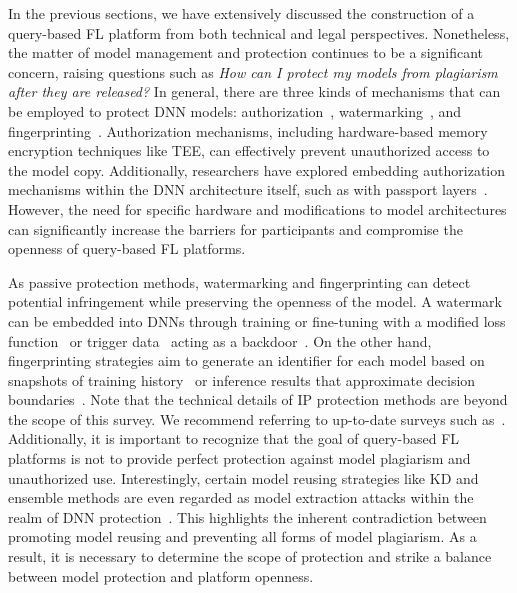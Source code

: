 In the previous sections, we have extensively discussed the construction of a query-based FL platform from both technical and legal perspectives. 
Nonetheless, the matter of model management and protection continues to be a significant concern, raising questions such as \textit{How can I protect my models from plagiarism after they are released?}
In general, there are three kinds of mechanisms that can be employed to protect DNN models: authorization~\cite{hanzlik2021mlcapsule}, watermarking~\cite{tekgul2021waffle}, and fingerprinting~\cite{li2023fedipr}.
Authorization mechanisms, including hardware-based memory encryption techniques like TEE, can effectively prevent unauthorized access to the model copy.
Additionally, researchers have explored embedding authorization mechanisms within the DNN architecture itself, such as with passport layers~\cite{fan2019rethinking, zhang2020passport}.
However, the need for specific hardware and modifications to model architectures can significantly increase the barriers for participants and compromise the openness of query-based FL platforms.

As passive protection methods, watermarking and fingerprinting can detect potential infringement while preserving the openness of the model. 
A watermark can be embedded into DNNs through training or fine-tuning with a modified loss function~\cite{uchida2017embedding} or trigger data~\cite{darvish2019deepsigns} acting as a backdoor~\cite{bagdasaryan2020backdoor}.
On the other hand, fingerprinting strategies aim to generate an identifier for each model based on snapshots of training history~\cite{jia2021proof} or inference results that approximate decision boundaries~\cite{chen2022copy}.
Note that the technical details of IP protection methods are beyond the scope of this survey.
We recommend referring to up-to-date surveys such as~\cite{peng2022intellectual, sun2023deep}.
Additionally, it is important to recognize that the goal of query-based FL platforms is not to provide perfect protection against model plagiarism and unauthorized use.
Interestingly, certain model reusing strategies like KD and ensemble methods are even regarded as model extraction attacks within the realm of DNN protection~\cite{charette2022cosine}.
This highlights the inherent contradiction between promoting model reusing and preventing all forms of model plagiarism.
As a result, it is necessary to determine the scope of protection and strike a balance between model protection and platform openness.

